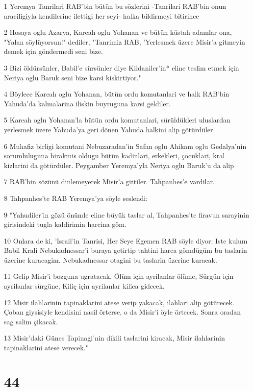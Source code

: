 \par 1 Yeremya Tanrilari RAB'bin bütün bu sözlerini -Tanrilari RAB'bin onun araciligiyla kendilerine ilettigi her seyi- halka bildirmeyi bitirince
\par 2 Hosaya oglu Azarya, Kareah oglu Yohanan ve bütün küstah adamlar ona, "Yalan söylüyorsun!" dediler, "Tanrimiz RAB, 'Yerlesmek üzere Misir'a gitmeyin demek için göndermedi seni bize.
\par 3 Bizi öldürsünler, Babil'e sürsünler diye Kildaniler'in* eline teslim etmek için Neriya oglu Baruk seni bize karsi kiskirtiyor."
\par 4 Böylece Kareah oglu Yohanan, bütün ordu komutanlari ve halk RAB'bin Yahuda'da kalmalarina iliskin buyruguna karsi geldiler.
\par 5 Kareah oglu Yohanan'la bütün ordu komutanlari, sürüldükleri uluslardan yerlesmek üzere Yahuda'ya geri dönen Yahuda halkini alip götürdüler.
\par 6 Muhafiz birligi komutani Nebuzaradan'in Safan oglu Ahikam oglu Gedalya'nin sorumluluguna birakmis oldugu bütün kadinlari, erkekleri, çocuklari, kral kizlarini da götürdüler. Peygamber Yeremya'yla Neriya oglu Baruk'u da alip
\par 7 RAB'bin sözünü dinlemeyerek Misir'a gittiler. Tahpanhes'e vardilar.
\par 8 Tahpanhes'te RAB Yeremya'ya söyle seslendi:
\par 9 "Yahudiler'in gözü önünde eline büyük taslar al, Tahpanhes'te firavun sarayinin girisindeki tugla kaldirimin harcina göm.
\par 10 Onlara de ki, 'Israil'in Tanrisi, Her Seye Egemen RAB söyle diyor: Iste kulum Babil Krali Nebukadnessar'i buraya getirtip tahtini harca gömdügüm bu taslarin üzerine kuracagim. Nebukadnessar otagini bu taslarin üzerine kuracak.
\par 11 Gelip Misir'i bozguna ugratacak. Ölüm için ayrilanlar ölüme, Sürgün için ayrilanlar sürgüne, Kiliç için ayrilanlar kilica gidecek.
\par 12 Misir ilahlarinin tapinaklarini atese verip yakacak, ilahlari alip götürecek. Çoban giysisiyle kendisini nasil örterse, o da Misir'i öyle örtecek. Sonra oradan sag salim çikacak.
\par 13 Misir'daki Günes Tapinagi'nin dikili taslarini kiracak, Misir ilahlarinin tapinaklarini atese verecek."

\chapter{44}

